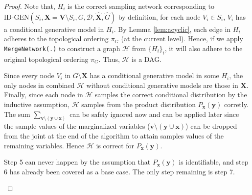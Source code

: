 \documentclass{article}
\newcommand{\x}{\mathbf{x}}
\newcommand{\y}{\mathbf{y}}
\newcommand{\X}{\mathbf{X}}
\newcommand{\Xp}{{\hat{\mathbf{X}}}}
\newcommand{\Gp}{{\hat{{G}}}}
\newcommand{\vb}{\mathbf{v}}
\newcommand{\data}{\mathcal{D}}
\newcommand{\idgen}{\text{ID-GEN}\xspace}
\newcommand{\idmerge}{\texttt{MergeNetwork(.)}\xspace}
\theoremstyle{plain}
\theoremstyle{definition}
\theoremstyle{remark}
\begin{document}
\begin{proof}
Note that, $H_i$ is the correct sampling network corresponding to 
		$\idgen(S_{i}, \mathbf{X}=\mathbf{V} \setminus S_{i}, G,  \data, {\Xp}, \Gp)$
		by definition, for each node $V_i\in S_i$, $V_i$ has a conditional generative model in $H_i$. By Lemma \ref{lem:acyclic}, each edge in $H_i$ adheres to the topological ordering $\pi_G$ (at the current level). Hence, if we apply \idmerge to construct a graph $\mathcal{H}$ from $\{H_i\}_i$, it will also adhere to the original topological ordering $\pi_G$. Thus, $\mathcal{H}$ is a DAG. 
  
  Since every node $V_i$ in $G\setminus \X$ has a conditional generative model in some $H_i$,
  the only nodes in combined $\mathcal{H}$ without conditional generative models are those in $\X$.
  Finally, since each node in $\mathcal{H}$ samples the correct conditional distribution by the inductive assumption, $\mathcal{H}$ samples from the product distribution $P_{\x}(\y)$ corretly. The sum $\sum_{\vb\setminus(\y\cup \x)}$ can be safely ignored now and can be applied later since the sample values of the marginalized variables ($\vb\setminus(\y\cup \x)$) can be dropped from the joint at the end of the algorithm to attain samples values of the remaining variables. Hence $\mathcal{H}$ is correct for $P_{\x}(\y)$.
		
		Step 5 can never happen by the %
		assumption that $P_{\x}(\y)$ is identifiable, and step 6 has already been covered as a base case. The only step remaining is step 7. 


	\begin{figure}[t!]
    \centering
    \centering
\end{figure}
\end{proof}
\end{document}
